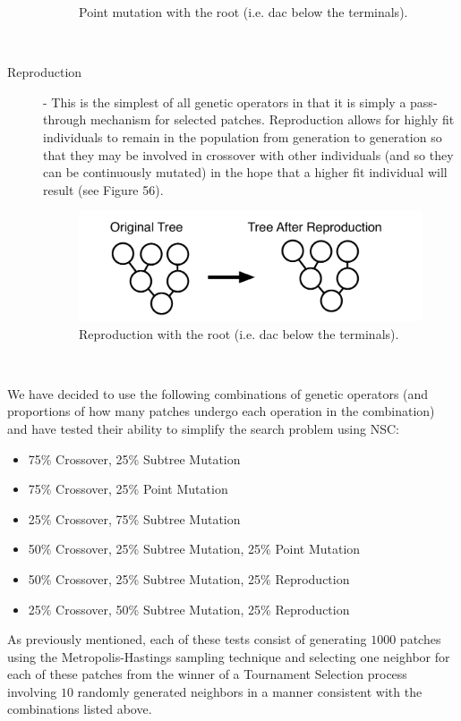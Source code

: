 \documentclass[12pt]{report} 	%
\numberwithin{figure}{chapter}
\numberwithin{table}{chapter}
\numberwithin{equation}{chapter}
\begin{document}
\begin{flushleft}
\begin{description}
\begin{figure}[h!]
\begin{center}
\caption[Point mutation]{Point mutation with the root (i.e. dac\texttildelow{} below the terminals).}
\end{center}
\vspace{6pt}
\end{figure}
\\
\item[Reproduction] - This is the simplest of all genetic operators in that it is simply a pass-through mechanism for selected patches. Reproduction allows for highly fit individuals to remain in the population from generation to generation so that they may be involved in crossover with other individuals (and so they can be continuously mutated) in the hope that a higher fit individual will result (see Figure 56).
\begin{figure}[h!]
\vspace{24pt}
\begin{center}
\includegraphics[scale=0.5]{Reproduction}
\caption[Reproduction]{Reproduction with the root (i.e. dac\texttildelow{} below the terminals).}
\end{center}
\end{figure}
\\
\end{description}

We have decided to use the following combinations of genetic operators (and proportions of how many patches undergo each operation in the combination) and have tested their ability to simplify the search problem using NSC:

\begin{itemize}
\item 75\% Crossover, 25\% Subtree Mutation
\item 75\% Crossover, 25\% Point Mutation
\item 25\% Crossover, 75\% Subtree Mutation
\item 50\% Crossover, 25\% Subtree Mutation, 25\% Point Mutation
\item 50\% Crossover, 25\% Subtree Mutation, 25\% Reproduction
\item 25\% Crossover, 50\% Subtree Mutation, 25\% Reproduction
\end{itemize}
As previously mentioned, each of these tests consist of generating $1000$ patches using the Metropolis-Hastings sampling technique and selecting one neighbor for each of these patches from the winner of a Tournament Selection process involving $10$ randomly generated neighbors in a manner consistent with the combinations listed above.


\end{flushleft}
\end{document}
